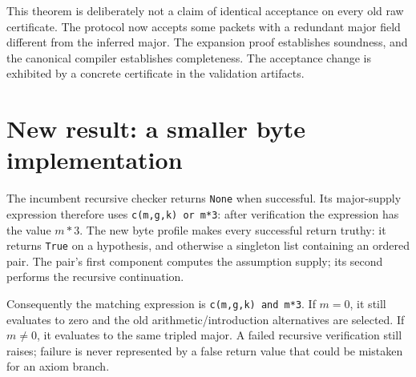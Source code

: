\documentclass[11pt,letterpaper]{article}
\theoremstyle{definition}
\begin{document}
This theorem is deliberately not a claim of identical acceptance on every
old raw certificate. The protocol now accepts some packets with a
redundant major field different from the inferred major. The expansion
proof establishes soundness, and the canonical compiler establishes
completeness. The acceptance change is exhibited by a concrete certificate
in the validation artifacts.

\section{New result: a smaller byte implementation}
\label{sec:byte-proof}

The incumbent recursive checker returns \texttt{None} when successful.
Its major-supply expression therefore uses
\texttt{c(m,g,k) or m*3}: after verification the expression has the value
$m*3$. The new byte profile makes every successful return truthy:
it returns \texttt{True} on a hypothesis, and otherwise a singleton list
containing an ordered pair. The pair's first component computes the
assumption supply; its second performs the recursive continuation.

Consequently the matching expression is
\texttt{c(m,g,k) and m*3}. If $m=0$, it still evaluates to zero and the
old arithmetic/introduction alternatives are selected. If $m\ne0$, it
evaluates to the same tripled major. A failed recursive verification still
raises; failure is never represented by a false return value that could
be mistaken for an axiom branch.
\end{document}
